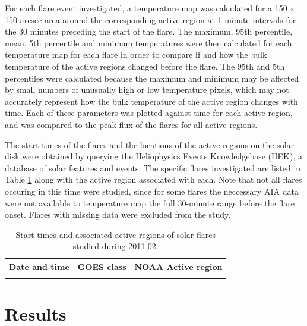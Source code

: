 \documentclass[referee,a4paper,12pt]{swsc}
\begin{document}
\begin{linenumbers}
For each flare event investigated, a temperature map was calculated for a 150 x 150 arcsec area around the corresponding active region at 1-minute intervals for the 30 minutes preceding the start of the flare. %
The maximum, 95th percentile, mean, 5th percentile and minimum temperatures were then calculated for each temperature map for each flare in order to compare if and how the bulk temperature of the active regions changed before the flare.
The 95th and 5th percentiles were calculated because the maximum and minimum may be affected by small numbers of unusually high or low temperature pixels, which may not accurately represent how the bulk temperature of the active region changes with time. %
Each of these parameters was plotted against time for each active region, and was compared to the peak flux of the flares for all active regions.

The start times of the flares and the locations of the active regions on the solar disk were obtained by querying the Heliophysics Events Knowledgebase (HEK), a database of solar features and events. %
The specific flares investigated are listed in Table \ref{tab:flares} along with the active region associated with each.
Note that not all flares occuring in this time were studied, since for some flares the neccessary AIA data were not available to temperature map the full 30-minute range before the flare onset.
Flares with missing data were excluded from the study.

\begin{longtable}{c|c|c}
	\caption{Start times and associated active regions of solar flares studied during 2011-02.}\\ %
		Date and time & GOES class & NOAA Active region \\
		\hline
		
	\label{tab:flares}
\end{longtable}

\section{Results}

\end{linenumbers}
\end{document}
